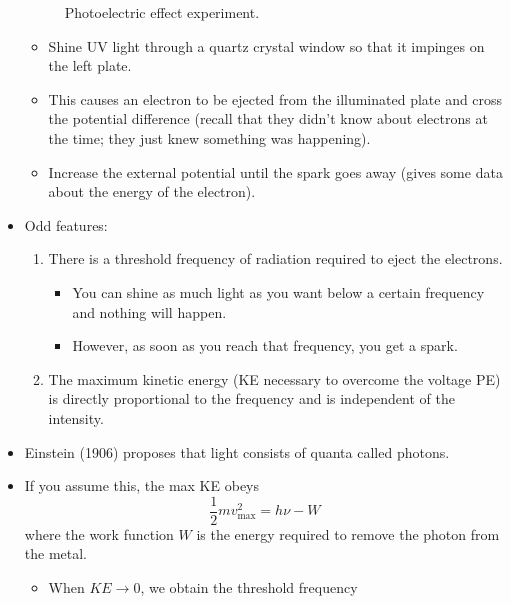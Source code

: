 \documentclass[../notes.tex]{subfiles}
\begin{document}
\begin{itemize}
\begin{figure}[h!]
        \caption{Photoelectric effect experiment.}
        \label{fig:PEeffectExp}
    \end{figure}
    \begin{itemize}
        \item Shine UV light through a quartz crystal window so that it impinges on the left plate.
        \item This causes an electron to be ejected from the illuminated plate and cross the potential difference (recall that they didn't know about electrons at the time; they just knew something was happening).
        \item Increase the external potential until the spark goes away (gives some data about the energy of the electron).
    \end{itemize}
    \item Odd features:
    \begin{enumerate}
        \item There is a threshold frequency of radiation required to eject the electrons.
        \begin{itemize}
            \item You can shine as much light as you want below a certain frequency and nothing will happen.
            \item However, as soon as you reach that frequency, you get a spark.
        \end{itemize}
        \item The maximum kinetic energy (KE necessary to overcome the voltage PE) is directly proportional to the frequency and is independent of the intensity.
    \end{enumerate}
    \item Einstein (1906) proposes that light consists of quanta called photons.
    \item If you assume this, the max KE obeys
    \begin{equation*}
        \frac{1}{2}mv_\text{max}^2 = h\nu-W
    \end{equation*}
    where the work function $W$ is the energy required to remove the photon from the metal.
    \begin{itemize}
        \item When $KE\to 0$, we obtain the threshold frequency

\end{itemize}
\end{itemize}
\end{document}
